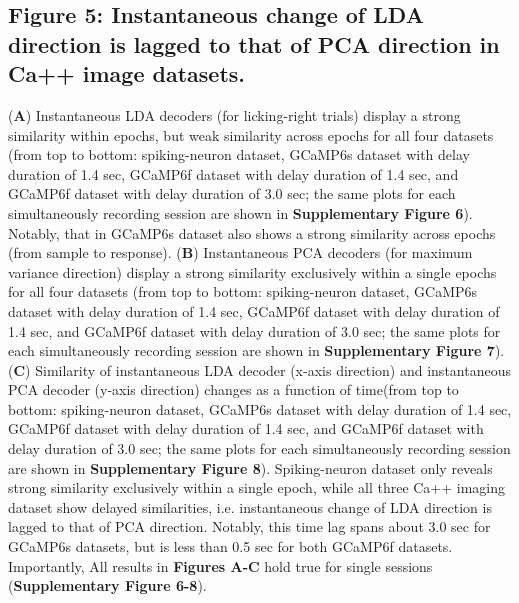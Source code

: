 \documentclass[12pt, oneside]{nature}
\begin{document}
\subsection{Figure 5: Instantaneous change of LDA direction is lagged to that of PCA direction
in Ca++ image datasets.}
(\textbf{A}) Instantaneous LDA decoders (for licking-right trials) display a strong similarity within 
epochs, but weak similarity across epochs for all four datasets (from top to bottom:
spiking-neuron dataset, 
GCaMP6s dataset with delay duration of 1.4 sec,
GCaMP6f dataset with delay duration of 1.4 sec, and GCaMP6f dataset with delay duration of 3.0 sec;
the same plots for each simultaneously recording session are shown in \textbf{Supplementary Figure 6}).
Notably, that in GCaMP6s dataset also shows a strong similarity across epochs (from sample to response).
(\textbf{B}) Instantaneous PCA decoders (for maximum variance direction) display a strong similarity 
exclusively within a single epochs for all four datasets (from top to bottom:
spiking-neuron dataset, 
GCaMP6s dataset with delay duration of 1.4 sec,
GCaMP6f dataset with delay duration of 1.4 sec, and GCaMP6f dataset with delay duration of 3.0 sec;
the same plots for each simultaneously recording session are shown in \textbf{Supplementary Figure 7}).
(\textbf{C}) Similarity of instantaneous LDA decoder (x-axis direction) and instantaneous PCA decoder
(y-axis direction) changes as a function of time(from top to bottom:
spiking-neuron dataset, 
GCaMP6s dataset with delay duration of 1.4 sec,
GCaMP6f dataset with delay duration of 1.4 sec, and GCaMP6f dataset with delay duration of 3.0 sec;
the same plots for each simultaneously recording session are shown in \textbf{Supplementary Figure 8}).
 Spiking-neuron dataset only reveals
strong similarity exclusively within a single epoch, while all three Ca++ imaging dataset
show delayed similarities, i.e. instantaneous change of LDA direction is lagged to that of PCA direction.
Notably, this time lag spans about 3.0 sec for GCaMP6s datasets, but is less than 0.5 sec for both
GCaMP6f datasets. 
Importantly, All results in \textbf{Figures A-C} hold true for single sessions (\textbf{Supplementary Figure 6-8}).
\end{document}
